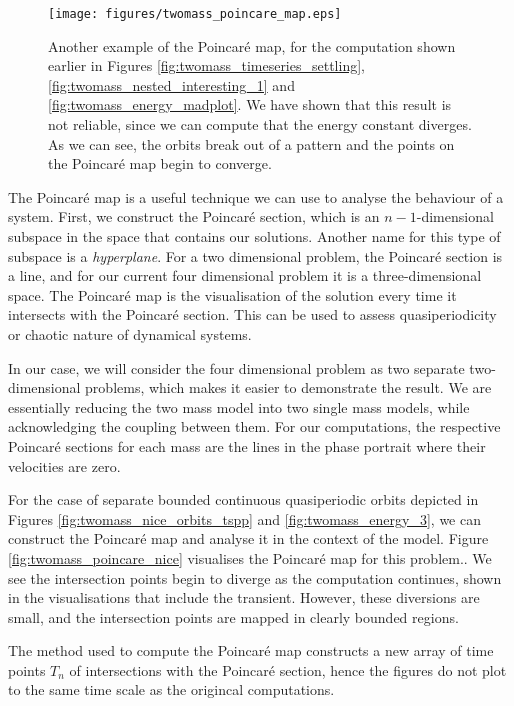 \documentclass{article}
\begin{document}
\begin{figure}
    \centering
    \texttt{[image: figures/twomass\_poincare\_map.eps]}
    \caption{
        Another example of the Poincar\'e map, for the computation shown earlier in Figures \ref{fig:twomass_timeseries_settling}, \ref{fig:twomass_nested_interesting_1} and \ref{fig:twomass_energy_madplot}.
        We have shown that this result is not reliable, since we can compute that the energy constant diverges.
        As we can see, the orbits break out of a pattern and the points on the Poincar\'e map begin to converge.
    }
    \label{fig:twomass_poincare_bad}
\end{figure}

The Poincar\'e map is a useful technique we can use to analyse the behaviour of a system.
First, we construct the Poincar\'e section,
which is an $n-1$-dimensional subspace in the space that contains our solutions.
Another name for this type of subspace is a \textit{hyperplane}.
For a two dimensional problem, the Poincar\'e section is a line,
and for our current four dimensional problem it is a three-dimensional space.
The Poincar\'e map is the visualisation of the solution every time it intersects with the Poincar\'e section.
This can be used to assess quasiperiodicity or chaotic nature of dynamical systems.

In our case, we will consider the four dimensional problem as two separate two-dimensional problems,
which makes it easier to demonstrate the result.
We are essentially reducing the two mass model into two single mass models,
while acknowledging the coupling between them.
For our computations, the respective Poincar\'e sections for each mass are the lines in the phase portrait where their velocities are zero.

For the case of separate bounded continuous quasiperiodic orbits depicted in Figures \ref{fig:twomass_nice_orbits_tspp} and \ref{fig:twomass_energy_3},
we can construct the Poincar\'e map and analyse it in the context of the model.
Figure \ref{fig:twomass_poincare_nice} visualises the Poincar\'e map for this problem..
We see the intersection points begin to diverge as the computation continues,
shown in the visualisations that include the transient.
However, these diversions are small,
and the intersection points are mapped in clearly bounded regions.

The method used \cite{manohar_2011} to compute the Poincar\'e map constructs a new array of time points $T_n$ of intersections with the Poincar\'e section,
hence the figures do not plot to the same time scale as the origincal computations.
\end{document}
